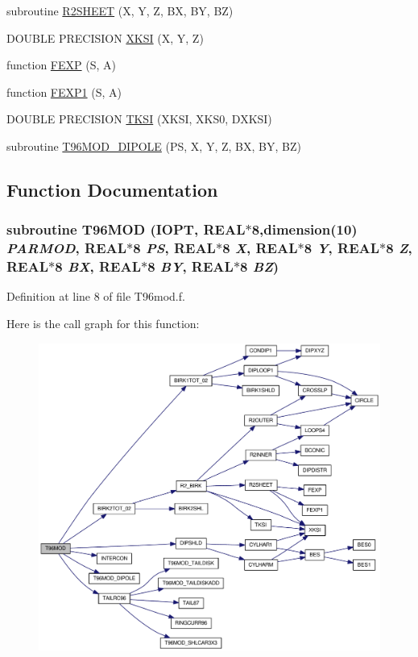\begin{CompactItemize}
subroutine \hyperlink{_t96mod_8f_d2c23a8a964ae249deaa1665da76803f}{R2SHEET} (X, Y, Z, BX, BY, BZ)
\item 
DOUBLE PRECISION \hyperlink{_t96mod_8f_34df9615369af608c58c50830a71bc2c}{XKSI} (X, Y, Z)
\item 
function \hyperlink{_t96mod_8f_de7e8858bac24c4e9ef3bbee7949e235}{FEXP} (S, A)
\item 
function \hyperlink{_t96mod_8f_4652a5d7098ea16cd1f49a0597effa56}{FEXP1} (S, A)
\item 
DOUBLE PRECISION \hyperlink{_t96mod_8f_2b6a113bedd0458c72d9e0723c3bb7d4}{TKSI} (XKSI, XKS0, DXKSI)
\item 
subroutine \hyperlink{_t96mod_8f_39c75fa7da285932d582aadcf8a2442d}{T96MOD\_\-DIPOLE} (PS, X, Y, Z, BX, BY, BZ)
\end{CompactItemize}


\subsection{Function Documentation}
\hypertarget{_t96mod_8f_d1b3c77658e29c0a582e4458288a48a7}{
\subsubsection[{T96MOD}]{\setlength{\rightskip}{0pt plus 5cm}subroutine T96MOD (IOPT, \/  REAL$\ast$8,dimension(10) {\em PARMOD}, \/  REAL$\ast$8 {\em PS}, \/  REAL$\ast$8 {\em X}, \/  REAL$\ast$8 {\em Y}, \/  REAL$\ast$8 {\em Z}, \/  REAL$\ast$8 {\em BX}, \/  REAL$\ast$8 {\em BY}, \/  REAL$\ast$8 {\em BZ})}}
\label{_t96mod_8f_d1b3c77658e29c0a582e4458288a48a7}




Definition at line 8 of file T96mod.f.

Here is the call graph for this function:\nopagebreak
\begin{figure}[H]
\begin{center}
\leavevmode
\includegraphics[width=343pt]{_t96mod_8f_d1b3c77658e29c0a582e4458288a48a7_cgraph}
\end{center}
\end{figure}


